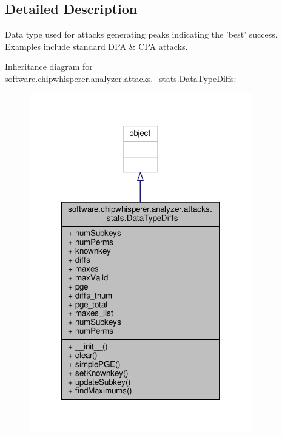 \subsection{Detailed Description}
\begin{DoxyVerb}Data type used for attacks generating peaks indicating the 'best' success. Examples include
standard DPA & CPA attacks.
\end{DoxyVerb}
 

Inheritance diagram for software.\+chipwhisperer.\+analyzer.\+attacks.\+\_\+stats.\+Data\+Type\+Diffs\+:\nopagebreak
\begin{figure}[H]
\begin{center}
\leavevmode
\includegraphics[width=275pt]{de/d45/classsoftware_1_1chipwhisperer_1_1analyzer_1_1attacks_1_1__stats_1_1DataTypeDiffs__inherit__graph}
\end{center}
\end{figure}



